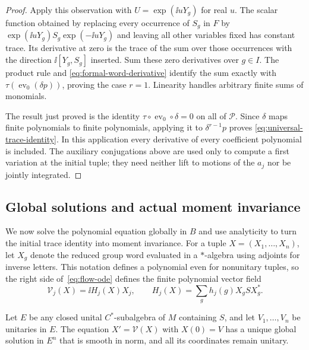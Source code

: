 \begin{proof}
Apply this observation with $U=\exp(\ii uY_g)$ for real $u$.
The scalar function obtained by replacing every occurrence of
$S_g$ in $F$ by $\exp(\ii uY_g)S_g\exp(-\ii uY_g)$ and leaving
all other variables fixed has constant trace. Its derivative at
zero is the trace of the sum over those occurrences with the
direction $\ii[Y_g,S_g]$ inserted. Sum these zero derivatives over
$g\in I$. The product rule and
\eqref{eq:formal-word-derivative} identify the sum exactly with
$\tau(\operatorname{ev}_0(\delta p))$, proving the case $r=1$.
Linearity handles arbitrary finite sums of monomials.

The result just proved is the identity
$\tau\circ\operatorname{ev}_0\circ\delta=0$ on all of
$\mathcal P$. Since $\delta$ maps finite polynomials to finite
polynomials, applying it to $\delta^{r-1}p$ proves
\eqref{eq:universal-trace-identity}. In this application every
derivative of every coefficient polynomial is included. The
auxiliary conjugations above are used only to compute a first
variation at the initial tuple; they need neither lift to motions
of the $a_j$ nor be jointly integrated.
\end{proof}

\subsection{Global solutions and actual moment invariance}

We now solve the polynomial equation globally in $B$ and use
analyticity to turn the initial trace identity into moment invariance.
For a tuple $X=(X_1,\ldots,X_n)$, let $X_g$ denote the reduced
group word evaluated in a $*$-algebra using adjoints for inverse
letters. This notation defines a polynomial even for nonunitary
tuples, so the right side of~\eqref{eq:flow-ode} defines the finite
polynomial vector field
\[
 \mathcal V_j(X)=\ii H_j(X)X_j,
 \qquad
 H_j(X)=\sum_g h_j(g)X_gSX_g^*.
\]

\begin{lemma}
\label{lem:flow-global-ode}
Let $E$ be any closed unital $C^*$-subalgebra of $M$ containing
$S$, and let $V_1,\ldots,V_n$ be unitaries in $E$. The equation
$X'=\mathcal V(X)$ with $X(0)=V$ has a unique global solution
in $E^n$ that is smooth in norm, and all its coordinates remain unitary.
\end{lemma}

